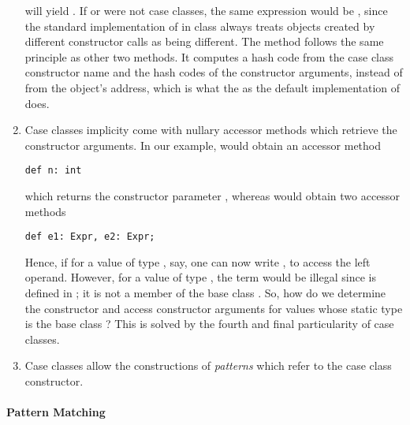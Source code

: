\documentclass[a4paper,12pt,twoside,titlepage]{book}
\begin{document}
\begin{enumerate}
will yield . If  or  were not case
classes, the same expression would be , since the standard
implementation of  in class  always treats
objects created by different constructor calls as being different.
The  method follows the same principle as other two
methods. It computes a hash code from the case class constructor name
and the hash codes of the constructor arguments, instead of from the object's
address, which is what the as the default implementation of  does.
\item 
Case classes implicity come with nullary accessor methods which
retrieve the constructor arguments.
In our example,  would obtain an accessor method
\begin{lstlisting}
def n: int
\end{lstlisting}
which returns the constructor parameter , whereas  would obtain two accessor methods
\begin{lstlisting}
def e1: Expr, e2: Expr;
\end{lstlisting}
Hence, if for a value  of type , say, one can now
write , to access the left operand. However, for a value
 of type , the term  would be illegal
since  is defined in ; it is not a member of the
base class . 
So, how do we determine the constructor and access constructor
arguments for values whose static type is the base class ?
This is solved by the fourth and final particularity of case classes.
\item 
Case classes allow the constructions of {\em patterns} which refer to
the case class constructor.
\end{enumerate}

\paragraph{Pattern Matching}
\end{document}
